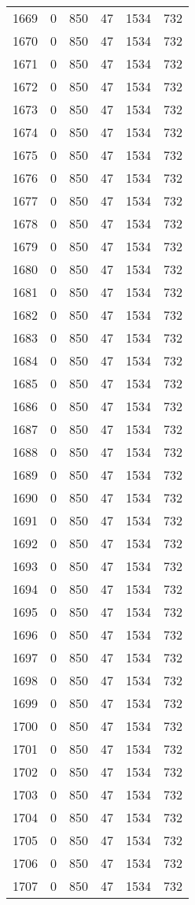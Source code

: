 \documentclass[a4paper]{ctexart}
\begin{document}
\begin{longtable}{p{1cm}|p{2cm}|p{2cm}|p{2cm}|P{2cm}|p{2cm}}
		1669&0&850&47&1534&732\\
		1670&0&850&47&1534&732\\
		1671&0&850&47&1534&732\\
		1672&0&850&47&1534&732\\
		1673&0&850&47&1534&732\\
		1674&0&850&47&1534&732\\
		1675&0&850&47&1534&732\\
		1676&0&850&47&1534&732\\
		1677&0&850&47&1534&732\\
		1678&0&850&47&1534&732\\
		1679&0&850&47&1534&732\\
		1680&0&850&47&1534&732\\
		1681&0&850&47&1534&732\\
		1682&0&850&47&1534&732\\
		1683&0&850&47&1534&732\\
		1684&0&850&47&1534&732\\
		1685&0&850&47&1534&732\\
		1686&0&850&47&1534&732\\
		1687&0&850&47&1534&732\\
		1688&0&850&47&1534&732\\
		1689&0&850&47&1534&732\\
		1690&0&850&47&1534&732\\
		1691&0&850&47&1534&732\\
		1692&0&850&47&1534&732\\
		1693&0&850&47&1534&732\\
		1694&0&850&47&1534&732\\
		1695&0&850&47&1534&732\\
		1696&0&850&47&1534&732\\
		1697&0&850&47&1534&732\\
		1698&0&850&47&1534&732\\
		1699&0&850&47&1534&732\\
		1700&0&850&47&1534&732\\
		1701&0&850&47&1534&732\\
		1702&0&850&47&1534&732\\
		1703&0&850&47&1534&732\\
		1704&0&850&47&1534&732\\
		1705&0&850&47&1534&732\\
		1706&0&850&47&1534&732\\
		1707&0&850&47&1534&732\\

\end{longtable}
\end{document}
